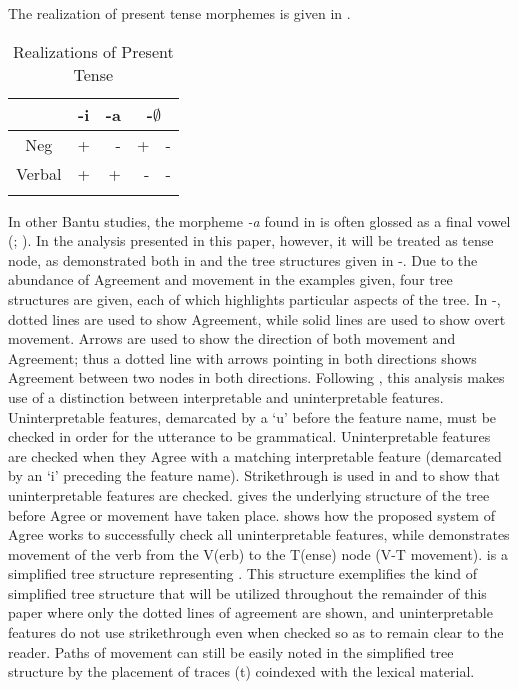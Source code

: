 \documentclass[output=paper]{langsci/langscibook}
\begin{document}
 
The realization of present tense morphemes is given in .

\begin{table}
\caption{Realizations of Present Tense} %
\centering %
\begin{tabular}{c| r|r|rr} %
\lsptoprule%
 &\multicolumn{1}{c}{-i}& \multicolumn{1}{|c|}{-a}& \multicolumn{2}{|c}{-$\emptyset$} \\ [0.5ex] 
\midrule%
Neg & + & - & + & -\\ %
Verbal & + & + & -& -\\[1ex] %
\lspbottomrule%
\end{tabular}
\label{tab:burkholder:3}
\end{table} 

 
In other Bantu studies, the morpheme \textit{-a} found in  is often glossed as a final vowel (\citealt{Khumalo1981,Khumalo1982}; \citealt{Sibanda2004}). In the analysis presented in this paper, however, it will be treated as tense node, as demonstrated both in  and the tree structures given in -. Due to the abundance of Agreement and movement in the examples given, four tree structures are given, each of which highlights particular aspects of the tree. In -, dotted lines are used to show Agreement, while solid lines are used to show overt movement. Arrows are used to show the direction of both movement and Agreement; thus a dotted line with arrows pointing in both directions shows Agreement between two nodes in both directions. Following \citet{Chomsky2001}, this analysis makes use of a distinction between interpretable and uninterpretable features. Uninterpretable features, demarcated by a `u' before the feature name, must be checked in order for the utterance to be grammatical. Uninterpretable features are checked when they Agree with a matching interpretable feature (demarcated by an `i' preceding the feature name). Strikethrough is used in  and  to show that uninterpretable features are checked.   gives the underlying structure of the tree before Agree or movement have taken place.  shows how the proposed system of Agree works to successfully check all uninterpretable features, while  demonstrates movement of the verb from the V(erb) to the T(ense) node (V-T movement).  is a simplified tree structure representing . This structure exemplifies the kind of simplified tree structure that will be utilized throughout the remainder of this paper where only the dotted lines of agreement are shown, and uninterpretable features do not use strikethrough even when checked so as to remain clear to the reader. Paths of movement can still be easily noted in the simplified tree structure by the placement of traces (t) coindexed with the lexical material.
\end{document}
